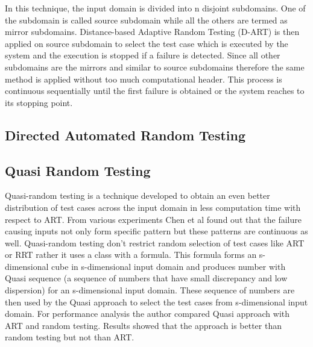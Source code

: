 In this technique, the input domain is divided into n disjoint subdomains. One of the subdomain is called source subdomain while all the others are termed as mirror subdomains. Distance-based Adaptive Random Testing (D-ART) is then applied on source subdomain to select the test case which is executed by the system and the execution is stopped if a failure is detected. Since all other subdomains are the mirrors and similar to source subdomains therefore the same method is applied without too much computational header. This process is continuous sequentially until the first failure is obtained or the system reaches to its stopping point.

\subsection{Directed Automated Random Testing}


\subsection{Quasi Random Testing}
Quasi-random testing \cite{Chen2005} is a technique developed to obtain an even better distribution of test cases across the input domain in less computation time with respect to ART. From various experiments Chen et al found out that the failure causing inputs not only form specific pattern but these patterns are continuous as well. Quasi-random testing don't restrict random selection of test cases like ART or RRT rather it uses a class with a formula. This formula forms an s-dimensional cube in s-dimensional input domain and produces number with Quasi sequence (a sequence of numbers that have small discrepancy and low dispersion) for an s-dimensional input domain. These sequence of numbers are then used by the Quasi approach to select the test cases from s-dimensional input domain. For performance analysis the author compared Quasi approach with ART and random testing. Results showed that the approach is better than random testing but not than ART.



